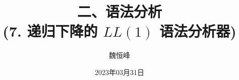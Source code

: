 \documentclass[]{beamer}
\title[语法分析]{二、语法分析 \\ (7. 递归下降的 $LL(1)$ 语法分析器)}
\author[魏恒峰]{\large 魏恒峰}
\institute{hfwei@nju.edu.cn}
\date{2023年03月31日}
\begin{document}
\maketitle



\thankyou{}

\end{document}

